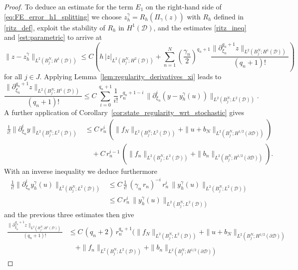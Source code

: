 \documentclass[a4paper,10pt]{article}
\newcommand{\cD}{{\mathcal{D}}}
\numberwithin{theorem}{section}
\begin{document}
\begin{proof}
To deduce an estimate for the term $E_1$ on the right-hand side of \eqref{eq:FE_error_h1_splitting} 
we choose $z_h^\gamma = R_h(\Pi_\gamma(z))$ with $R_h$ defined in \eqref{ritz_def}, exploit the stability of $R_h$ in $H^1(\cD)$, and the estimates \eqref{ritz_ineq} and \eqref{est:parametric} to arrive at
\begin{equation}
  \label{eq:error_est_dual_solution}
  \|z-z_h^\gamma\|_{L^2(B_j^N; H^1(\cD))}
  \le C\left(h\,|z|_{L^2(B_j^N; H^2(\cD))} + \sum_{n=1}^N \left(\frac{\gamma_n}{2}\right)^{q_n+1} \frac{\|\partial_{\xi_n}^{q_n+1} z\|_{L^2(B_j^N; H^1(\cD))}}{(q_n+1)!}\right)
\end{equation}
for all $j\in J$.
Applying Lemma~\ref{lem:regularity_derivatives_xi} leads to
  \begin{equation*}
    \frac{\|\partial_{\xi_n}^{q_n+1} z\|_{L^2(B_j^N; H^1(\cD))}}{(q_n+1)!}
    \le
    C\,\sum_{i=0}^{q_n+1} \frac{1}{i!}\,r_n^{q_n+1-i}\,\|\partial_{\xi_n}^i (y-y_h^\gamma(u))\|_{L^2(B_j^N; L^2(\cD))}.
  \end{equation*}
  A further application of Corollary~\ref{cor:state_regularity_wrt_stochastic} gives  %
  \begin{align*}
    \frac1{i!} \|\partial_{\xi_n}^i y\|_{L^2(B_j^N; L^2(\cD))}
    &\le
      C\,r_n^i\, \left(\|f_N\|_{L^2(B_j^N; L^2(\cD))} + \|u + b_N\|_{L^2(B_j^N; H^{1/2}(\partial\cD))}\right) \\
    &\quad +   C\,r_n^{i-1}\,\left(\|f_n\|_{L^2(B_j^N; L^2(\cD))} +
      \|b_n\|_{L^2(B_j^N; H^{1/2}(\partial\cD))}\right).
  \end{align*}
  With an inverse inequality we deduce furthermore
  \begin{align*}
    \frac1{i!} \|\partial_{\xi_n}^i y_h^\gamma(u)\|_{L^2(B_j^N; L^2(\cD))} &\le C\,\frac{1}{i!}\,(\gamma_n\,r_n)^{-i}\,r_n^i \,\|y_h^\gamma(u)\|_{L^2(B_j^N; L^2(\cD))} \\
    &\le C\,r_n^i\,\|y_h^\gamma(u)\|_{L^2(B_j^N; L^2(\cD))}
  \end{align*}
  and the previous three estimates then give
  \begin{align*}
    \frac{\|\partial_{\xi_n}^{q_n+1} z\|_{L^2(B_j^N; H^1(\cD))}}{(q_n+1)!}
    &\le C\,
    (q_n+2)\,r_n^{q_n+1}
    \Big(\|f_N\|_{L^2(B_j^N; L^2(\cD))} + \|u + b_N\|_{L^2(B_j^N;H^{1/2}(\partial\cD))} \\
    & \quad + \|f_n\|_{L^2(B_j^N; L^2(\cD))} + \|b_n\|_{L^2(B_j^N; H^{1/2}(\partial\cD))}

\end{align*}
\end{proof}
\end{document}
